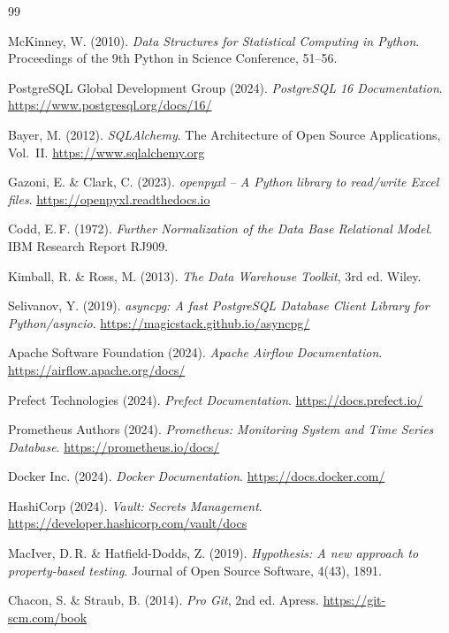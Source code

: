 \documentclass[12pt,a4paper]{report}
\theoremstyle{definition}
\theoremstyle{remark}
\begin{document}
\begin{thebibliography}{99}

  McKinney, W. (2010).
  \textit{Data Structures for Statistical Computing in Python}.
  Proceedings of the 9th Python in Science Conference, 51--56.

  PostgreSQL Global Development Group (2024).
  \textit{PostgreSQL 16 Documentation}.
  \url{https://www.postgresql.org/docs/16/}

  Bayer, M. (2012).
  \textit{SQLAlchemy}.
  The Architecture of Open Source Applications, Vol.~II.
  \url{https://www.sqlalchemy.org}

  Gazoni, E. \& Clark, C. (2023).
  \textit{openpyxl -- A Python library to read/write Excel files}.
  \url{https://openpyxl.readthedocs.io}

  Codd, E.\,F. (1972).
  \textit{Further Normalization of the Data Base Relational Model}.
  IBM Research Report RJ909.

  Kimball, R. \& Ross, M. (2013).
  \textit{The Data Warehouse Toolkit}, 3rd ed.
  Wiley.

  Selivanov, Y. (2019).
  \textit{asyncpg: A fast PostgreSQL Database Client Library for Python/asyncio}.
  \url{https://magicstack.github.io/asyncpg/}

  Apache Software Foundation (2024).
  \textit{Apache Airflow Documentation}.
  \url{https://airflow.apache.org/docs/}

  Prefect Technologies (2024).
  \textit{Prefect Documentation}.
  \url{https://docs.prefect.io/}

  Prometheus Authors (2024).
  \textit{Prometheus: Monitoring System and Time Series Database}.
  \url{https://prometheus.io/docs/}

  Docker Inc. (2024).
  \textit{Docker Documentation}.
  \url{https://docs.docker.com/}

  HashiCorp (2024).
  \textit{Vault: Secrets Management}.
  \url{https://developer.hashicorp.com/vault/docs}

  MacIver, D.\,R. \& Hatfield-Dodds, Z. (2019).
  \textit{Hypothesis: A new approach to property-based testing}.
  Journal of Open Source Software, 4(43), 1891.

  Chacon, S. \& Straub, B. (2014).
  \textit{Pro Git}, 2nd ed.
  Apress. \url{https://git-scm.com/book}


\end{thebibliography}
\end{document}
